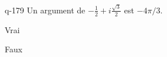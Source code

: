 \begin{truefalse}{q-179}
Un argument de $-\frac{1}{2}+i\frac{\sqrt 3}{2}$ est $-4\pi/3$.
\item* Vrai
\item Faux
\end{truefalse}

